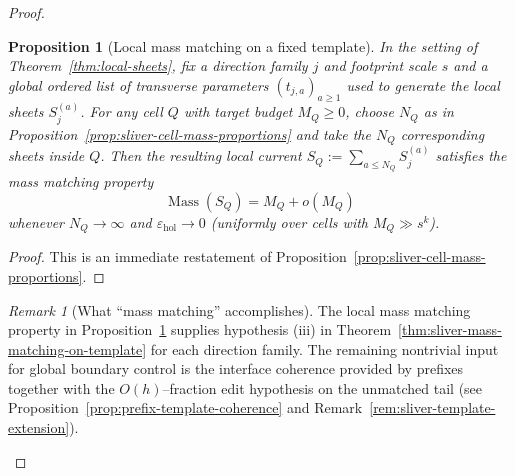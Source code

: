 \documentclass[11pt]{article}
\numberwithin{equation}{section}  %
\theoremstyle{plain}
\newtheorem{proposition}[theorem]{Proposition}
\theoremstyle{definition}
\theoremstyle{remark}
\newtheorem{remark}[theorem]{Remark}
\DeclareMathOperator{\Mass}{Mass}
\begin{document}
\begin{proof}
\begin{proposition}[Local mass matching on a fixed template]\label{prop:sliver-mass-matching}
In the setting of Theorem~\ref{thm:local-sheets}, fix a direction family $j$ and footprint scale $s$ and a global ordered list of
transverse parameters $(t_{j,a})_{a\ge 1}$ used to generate the local sheets $S^{(a)}_j$.
For any cell $Q$ with target budget $M_Q\ge 0$, choose $N_Q$ as in Proposition~\ref{prop:sliver-cell-mass-proportions}
and take the $N_Q$ corresponding sheets inside $Q$.
Then the resulting local current $S_Q:=\sum_{a\le N_Q}S^{(a)}_j$ satisfies the mass matching property
\[
\Mass(S_Q)=M_Q+o(M_Q)
\]
whenever $N_Q\to\infty$ and $\varepsilon_{\mathrm{hol}}\to 0$ (uniformly over cells with $M_Q\gg s^{k}$).
\end{proposition}

\begin{proof}
This is an immediate restatement of Proposition~\ref{prop:sliver-cell-mass-proportions}.
\end{proof}


\begin{remark}[What ``mass matching'' accomplishes]\label{rem:sliver-matching-remark}
The local mass matching property in Proposition~\ref{prop:sliver-mass-matching} supplies hypothesis
\textnormal{(iii)} in Theorem~\ref{thm:sliver-mass-matching-on-template} for each direction family.
The remaining nontrivial input for global boundary control is the interface coherence provided by prefixes together with
the $O(h)$--fraction edit hypothesis on the unmatched tail (see Proposition~\ref{prop:prefix-template-coherence}
and Remark~\ref{rem:sliver-template-extension}).
\end{remark}



\end{proof}
\end{document}
